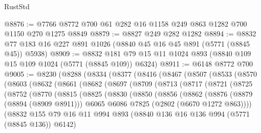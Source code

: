 \begin{lexlean}{RustStd}
\begin{coremodule}
@8876 := @7766 @8772 @700 @61 @282 @16 @1158 @249 @863 @1282 @700 @1150 @270 @1275 @8849
@8879 := @8827 @249 @282 @1282
@8894 := @8832 @77 @183 @16 @227 @891 @1026 (@8840 @45 @16 @45 @891 (@5771 (@8845 @45)) @5938)
@8909 := @8832 @181 @79 @15 @11 @1024 @893 (@8840 @109 @15 @109 @1024 (@5771 (@8845 @109)) @6324)
@8911 := @6148 @8772 @700
@9005 := @8230
    (@8288
      (@8334
        (@8377
          (@8416
            (@8467
              (@8507
                (@8533
                  (@8570
                    (@8603
                      (@8632
                        (@8661
                          (@8682
                            (@8697
                              (@8709
                                (@8713
                                  (@8717
                                    (@8721
                                      (@8725
                                        (@8752
                                          (@8770
                                            (@8815
                                              (@8825
                                                (@8830
                                                  (@8850
                                                    (@8856
                                                      (@8862
                                                        (@8876
                                                          (@8879 (@8894 (@8909 @8911)))
                                                          @6065
                                                          @6086
                                                          @7825
                                                          (@2802 (@6670 @1272 @863))))
                                                      (@8832
                                                        @155
                                                        @79
                                                        @16
                                                        @11
                                                        @994
                                                        @893
                                                        (@8840
                                                          @136
                                                          @16
                                                          @136
                                                          @994
                                                          (@5771 (@8845 @136))
                                                          @6142)

\end{coremodule}
\end{lexlean}
